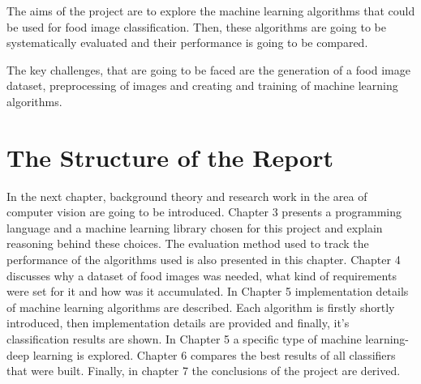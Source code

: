 The aims of the project are to explore the machine learning algorithms that could be used for food image classification.
Then, these algorithms are going to be systematically evaluated and their performance is going to be compared.

The key challenges, that are going to be faced are the generation of a food image dataset, preprocessing of images and creating and training of machine learning algorithms.

\section{The Structure of the Report}
In the next chapter, background theory and research work in the area of computer vision are going to be introduced. Chapter 3 presents a programming language and a  machine learning library chosen for this project and explain reasoning behind these choices. The evaluation method used to track the performance of the algorithms used is also presented in this chapter. Chapter 4 discusses why a dataset of food images was needed, what kind of requirements were set for it and how was it accumulated. In Chapter 5 implementation details of machine learning algorithms are described. Each algorithm is firstly shortly introduced, then implementation details are provided and finally, it's classification results are shown.  In Chapter 5 a specific type of machine learning- deep learning is explored. Chapter 6 compares the best results of all classifiers that were built. Finally, in chapter 7 the conclusions of the project are derived.